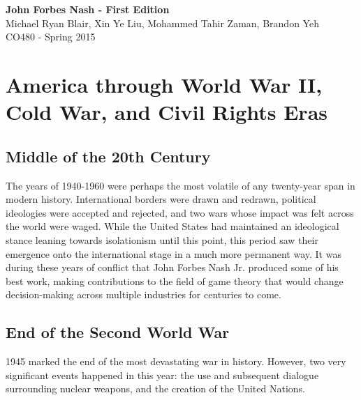 \documentclass[12pt]{article}
\begin{document}
	\thispagestyle{empty}
	\setcounter{page}{1}
	\begin{center}
		\vspace*{3cm}	
		\textbf{\LARGE John Forbes Nash - First Edition}\\
		\vspace{5pt}
		\large Michael Ryan Blair, Xin Ye Liu, Mohammed Tahir Zaman, Brandon Yeh\\
		\vspace{5pt}
		CO480 - Spring 2015\\
	\end{center}
	
	\newpage
	
	\tableofcontents
	\newpage
	\singlespacing

\section{America through World War II, Cold War, and Civil Rights Eras}

\subsection{Middle of the 20th Century}

The years of 1940-1960 were perhaps the most volatile of any twenty-year span in modern history. International borders were drawn and redrawn, political ideologies were accepted and rejected, and two wars whose impact was felt across the world were waged. While the United States had maintained an ideological stance leaning towards isolationism until this point, this period saw their emergence onto the international stage in a much more permanent way. It was during these years of conflict that John Forbes Nash Jr. produced some of his best work, making contributions to the field of game theory that would change decision-making across multiple industries for centuries to come. 

\subsection{End of the Second World War}

1945 marked the end of the most devastating war in history. However, two very significant events happened in this year: the use and subsequent dialogue surrounding nuclear weapons, and the creation of the United Nations.\\
\end{document}
